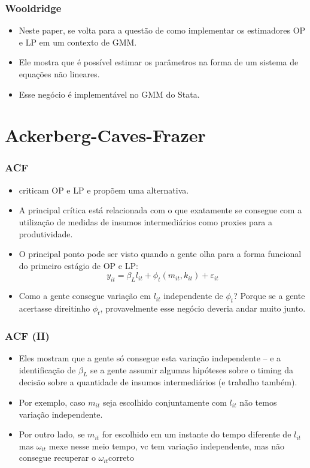 \documentclass{beamer}
\begin{document}
\begin{frame}\frametitle{Wooldridge}

\begin{itemize}
\item Neste paper, \citet{Wooldridge2009} se volta para a questão de como implementar
os estimadores OP e LP em um contexto de GMM.
\item Ele mostra que é possível estimar os parâmetros na forma de um sistema
de equações não lineares.
\item Esse negócio é implementável no GMM do Stata.
\end{itemize}
\end{frame}

\section{Ackerberg-Caves-Frazer}
\begin{frame}\frametitle{ACF}

\begin{itemize}
\item \citet{Ackerberg2005c} criticam OP e LP e propõem uma alternativa.
\item A principal crítica está relacionada com o que exatamente se consegue
com a utilização de medidas de insumos intermediários como proxies
para a produtividade.
\item O principal ponto pode ser visto quando a gente olha para a forma
funcional do primeiro estágio de OP e LP:
\[
y_{it}=\beta_{L}l_{it}+\phi_{t}(m_{it},k_{it})+\varepsilon_{it}
\]
\item Como a gente consegue variação em $l_{it}$ independente de $\phi_{t}$?
Porque se a gente acertasse direitinho $\phi_{t}$, provavelmente
esse negócio deveria andar muito junto.
\end{itemize}
\end{frame}

\begin{frame}\frametitle{ACF (II)}

\begin{itemize}
\item Eles mostram que a gente só consegue esta variação independente --
e a identificação de $\beta_{L}$ se a gente assumir algumas hipóteses
sobre o timing da decisão sobre a quantidade de insumos intermediários
(e trabalho também).
\item Por exemplo, caso $m_{it}$ seja escolhido conjuntamente com $l_{it}$
não temos variação independente.
\item Por outro lado, se $m_{it}$ for escolhido em um instante do tempo
diferente de $l_{it}$ mas $\omega_{it}$ mexe nesse meio tempo, vc
tem variação independente, mas não consegue recuperar o $\omega_{it}$correto
\end{itemize}
\end{frame}
\end{document}
